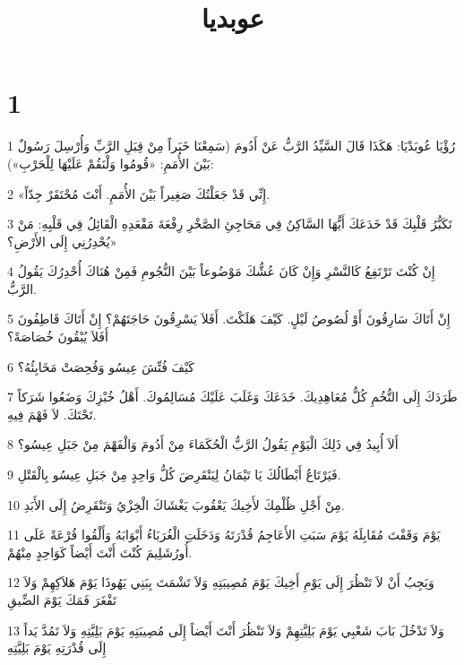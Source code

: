 

\title{عوبديا}


\chapter{1}

\par 1 رُؤْيَا عُوبَدْيَا: هَكَذَا قَالَ السَّيِّدُ الرَّبُّ عَنْ أَدُومَ (سَمِعْنَا خَبَراً مِنْ قِبَلِ الرَّبِّ وَأُرْسِلَ رَسُولٌ بَيْنَ الأُمَمِ: «قُومُوا وَلْنَقُمْ عَلَيْهَا لِلْحَرْبِ»):
\par 2 «إِنِّي قَدْ جَعَلْتُكَ صَغِيراً بَيْنَ الأُمَمِ. أَنْتَ مُحْتَقَرٌ جِدّاً.
\par 3 تَكَبُّرُ قَلْبِكَ قَدْ خَدَعَكَ أَيُّهَا السَّاكِنُ فِي مَحَاجِئِ الصَّخْرِ رِفْعَةَ مَقْعَدِهِ الْقَائِلُ فِي قَلْبِهِ: مَنْ يُحْدِرُنِي إِلَى الأَرْضِ؟»
\par 4 إِنْ كُنْتَ تَرْتَفِعُ كَالنَّسْرِ وَإِنْ كَانَ عُشُّكَ مَوْضُوعاً بَيْنَ النُّجُومِ فَمِنْ هُنَاكَ أُحْدِرُكَ يَقُولُ الرَّبُّ.
\par 5 إِنْ أَتَاكَ سَارِقُونَ أَوْ لُصُوصُ لَيْلٍ. كَيْفَ هَلَكْتَ. أَفَلاَ يَسْرِقُونَ حَاجَتَهُمْ؟ إِنْ أَتَاكَ قَاطِفُونَ أَفَلاَ يُبْقُونَ خُصَاصَةً؟
\par 6 كَيْفَ فُتِّشَ عِيسُو وَفُحِصَتْ مَخَابِئُهُ؟
\par 7 طَرَدَكَ إِلَى التُّخُمِ كُلُّ مُعَاهِدِيكَ. خَدَعَكَ وَغَلَبَ عَلَيْكَ مُسَالِمُوكَ. أَهْلُ خُبْزِكَ وَضَعُوا شَرَكاً تَحْتَكَ. لاَ فَهْمَ فِيهِ.
\par 8 أَلاَ أُبِيدُ فِي ذَلِكَ الْيَوْمِ يَقُولُ الرَّبُّ الْحُكَمَاءَ مِنْ أَدُومَ وَالْفَهْمَ مِنْ جَبَلِ عِيسُو؟
\par 9 فَيَرْتَاعُ أَبْطَالُكَ يَا تَيْمَانُ لِيَنْقَرِضَ كُلُّ وَاحِدٍ مِنْ جَبَلِ عِيسُو بِالْقَتْلِ.
\par 10 مِنْ أَجْلِ ظُلْمِكَ لأَخِيكَ يَعْقُوبَ يَغْشَاكَ الْخِزْيُ وَتَنْقَرِضُ إِلَى الأَبَدِ.
\par 11 يَوْمَ وَقَفْتَ مُقَابِلَهُ يَوْمَ سَبَتِ الأَعَاجِمُ قُدْرَتَهُ وَدَخَلَتِ الْغُرَبَاءُ أَبْوَابَهُ وَأَلْقُوا قُرْعَةً عَلَى أُورُشَلِيمَ كُنْتَ أَنْتَ أَيْضاً كَوَاحِدٍ مِنْهُمْ.
\par 12 وَيَجِبُ أَنْ لاَ تَنْظُرَ إِلَى يَوْمِ أَخِيكَ يَوْمَ مُصِيبَتِهِ وَلاَ تَشْمَتَ بِبَنِي يَهُوذَا يَوْمَ هَلاَكِهِمْ وَلاَ تَفْغَرَ فَمَكَ يَوْمَ الضِّيقِ
\par 13 وَلاَ تَدْخُلَ بَابَ شَعْبِي يَوْمَ بَلِيَّتِهِمْ وَلاَ تَنْظُرَ أَنْتَ أَيْضاً إِلَى مُصِيبَتِهِ يَوْمَ بَلِيَّتِهِ وَلاَ تَمُدَّ يَداً إِلَى قُدْرَتِهِ يَوْمَ بَلِيَّتِهِ
